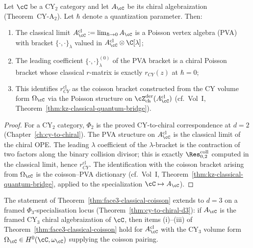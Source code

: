 \begin{theorem}[Face 3: classical Poisson coisson, \texorpdfstring{$d = 2$}{d = 2} \textup{(}genus~\texorpdfstring{$0$}{0} only\textup{)}]
\label{thm:face3-classical-coisson}
Let $\cC$ be a CY$_2$ category and let $A_\cC$ be its chiral
algebraization (Theorem~CY-A$_2$). Let $\hbar$ denote a quantization
parameter. Then:
\begin{enumerate}[label=(\roman*)]
\item The classical limit $A_\cC^{\mathrm{cl}} := \lim_{\hbar \to 0}
A_\cC$ is a Poisson vertex algebra (PVA) with bracket
$\{\cdot,\cdot\}_\lambda$ valued in $A_\cC^{\mathrm{cl}} \otimes
\C[\lambda]$;
\item The leading coefficient $\{\cdot,\cdot\}_\lambda^{(0)}$ of the
PVA bracket is a chiral Poisson bracket whose classical $r$-matrix
is exactly $r_{CY}(z)$ at $\hbar = 0$;
\item This identifies $r_{CY}^{\mathrm{cl}}$ as the coisson bracket
constructed from the CY volume form $\Omega_\cC$ via the Poisson
structure on $\cZ^{\mathrm{der}}_{\mathrm{ch}}(A_\cC^{\mathrm{cl}})$
(cf.\ Vol~I, Theorem~\ref{thm:kz-classical-quantum-bridge}).
\end{enumerate}
\end{theorem}

\begin{proof}
For a CY$_2$ category, $\Phi_2$ is the proved CY-to-chiral correspondence at $d=2$
(Chapter~\ref{ch:cy-to-chiral}). The PVA structure on $A_\cC^{\mathrm{cl}}$
is the classical limit of the chiral OPE. The leading $\lambda$
coefficient of the $\lambda$-bracket is the contraction of two factors
along the binary collision divisor; this is exactly
$\Res^{\mathrm{coll}}_{0,2}$ computed in the classical limit, hence
$r_{CY}^{\mathrm{cl}}$. The identification with the coisson bracket
arising from $\Omega_\cC$ is the coisson--PVA dictionary
(cf.\ Vol~I, Theorem~\ref{thm:kz-classical-quantum-bridge}, applied to
the specialization $\cC \mapsto A_\cC$).
\end{proof}

\begin{conjecture}[Face 3: classical Poisson coisson, \texorpdfstring{$d = 3$}{d = 3} \textup{(}genus~\texorpdfstring{$0$}{0} only\textup{)}]
\label{conj:face3-classical-coisson-d3}
\ClaimStatusConjectured
The statement of Theorem~\ref{thm:face3-classical-coisson} extends to
$d = 3$ on a framed $\Phi_3$-specialisation locus
(Theorem~\ref{thm:cy-to-chiral-d3}): if $A_\cC$ is the
framed CY$_3$ chiral algebraization of $\cC$, then items (i)--(iii) of
Theorem~\ref{thm:face3-classical-coisson} hold for $A_\cC^{\mathrm{cl}}$
with the CY$_3$ volume form $\Omega_\cC \in H^0(\cC, \omega_\cC)$
supplying the coisson pairing.
\end{conjecture}


